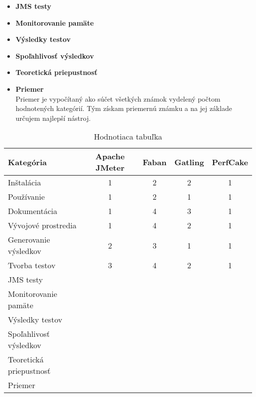 \documentclass[12pt,oneside,final]{fithesis-utf8}
\begin{document}
\begin{itemize}
\item \textbf{JMS testy}\\


\item \textbf{Monitorovanie pamäte}\\


\item \textbf{Výsledky testov}\\


\item \textbf{Spoľahlivosť výsledkov}\\


\item \textbf{Teoretická priepustnosť}\\


\item \textbf{Priemer}\\
Priemer je vypočítaný ako súčet všetkých známok vydelený počtom hodnotených kategórií. Tým získam priemernú známku a na jej základe určujem najlepší nástroj.


\end{itemize}


\begin{table}[h!]
\begin{center}
\begin{tabular}{ | l | c | c | c | c |}
		\hline
		 \textbf{Kategória} & \textbf{Apache JMeter} & \textbf{Faban} & \textbf{Gatling} & \textbf{PerfCake} \\ \hline
		 Inštalácia & 1 & 2 & 2 & 1 \\ \hline
		 Používanie & 1 & 2 & 1 & 1 \\ \hline
		 Dokumentácia & 1 & 4 & 3 & 1 \\ \hline
		 Vývojové prostredia & 1 & 4 & 2 & 1 \\ \hline
		 Generovanie výsledkov & 2 & 3 & 1 & 1 \\ \hline
		 Tvorba testov & 3 & 4 & 2 & 1 \\ \hline
 		 JMS testy &  &  &  &  \\ \hline
		 Monitorovanie pamäte &  &  &  &  \\ \hline
		 Výsledky testov &  &  &  & \\ \hline
		 Spoľahlivosť výsledkov &  &  &  & \\ \hline
		 Teoretická priepustnosť &  &  &  & \\ \hline
		 Priemer &  &  &  & \\ \hline
		 
\end{tabular}
\end{center}
\caption{Hodnotiaca tabuľka}
\end{table}
\end{document}
